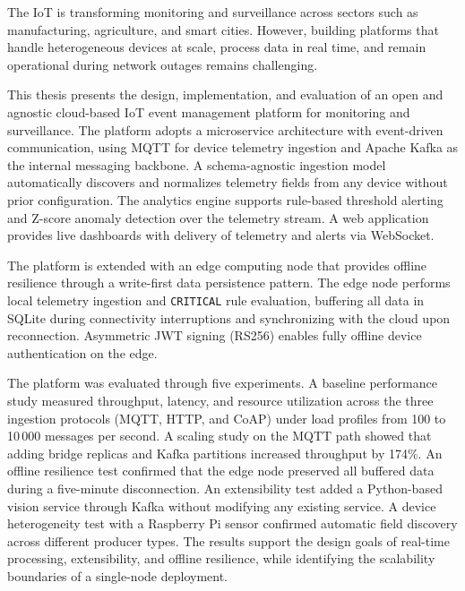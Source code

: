 
%

The \gls{IoT} is transforming monitoring and surveillance across sectors such as manufacturing, agriculture, and smart cities. However, building platforms that handle heterogeneous devices at scale, process data in real time, and remain operational during network outages remains challenging.

This thesis presents the design, implementation, and evaluation of an open and agnostic cloud-based \gls{IoT} event management platform for monitoring and surveillance. The platform adopts a microservice architecture with event-driven communication, using \gls{MQTT} for device telemetry ingestion and Apache Kafka as the internal messaging backbone. A schema-agnostic ingestion model automatically discovers and normalizes telemetry fields from any device without prior configuration. The analytics engine supports rule-based threshold alerting and Z-score anomaly detection over the telemetry stream. A web application provides live dashboards with delivery of telemetry and alerts via WebSocket.

The platform is extended with an edge computing node that provides offline resilience through a write-first data persistence pattern. The edge node performs local telemetry ingestion and \texttt{CRITICAL} rule evaluation, buffering all data in SQLite during connectivity interruptions and synchronizing with the cloud upon reconnection. Asymmetric \gls{JWT} signing (RS256) enables fully offline device authentication on the edge.

The platform was evaluated through five experiments. A baseline performance study measured throughput, latency, and resource utilization across the three ingestion protocols (\gls{MQTT}, \gls{HTTP}, and \gls{CoAP}) under load profiles from 100 to 10\,000 messages per second. A scaling study on the \gls{MQTT} path showed that adding bridge replicas and Kafka partitions increased throughput by 174\%. An offline resilience test confirmed that the edge node preserved all buffered data during a five-minute disconnection. An extensibility test added a Python-based vision service through Kafka without modifying any existing service. A device heterogeneity test with a Raspberry Pi sensor confirmed automatic field discovery across different producer types. The results support the design goals of real-time processing, extensibility, and offline resilience, while identifying the scalability boundaries of a single-node deployment.

